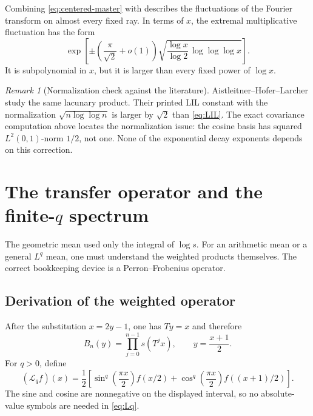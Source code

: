 \documentclass[11pt,oneside]{article}
\numberwithin{equation}{section}
\theoremstyle{definition}
\theoremstyle{remark}
\newtheorem{remark}[theorem]{Remark}
\newcommand{\Transfer}{\mathcal L}
\begin{document}
Combining \eqref{eq:centered-master} with  describes the fluctuations of
the Fourier transform on almost every fixed ray.  In terms of \(x\), the extremal
multiplicative fluctuation has the form
\begin{equation}
 \exp\!\left[\pm\left(\frac\pi{\sqrt2}+o(1)\right)
 \sqrt{\frac{\log x}{\log2}\,\log\log\log x}\right].
 \label{eq:multiplicative-LIL}
\end{equation}
It is subpolynomial in \(x\), but it is larger than every fixed power of \(\log x\).

\begin{remark}[Normalization check against the literature]
Aistleitner--Hofer--Larcher \cite{ahl} study the same lacunary product.  Their printed LIL
constant with the normalization \(\sqrt{n\log\log n}\) is larger by \(\sqrt2\) than
\eqref{eq:LIL}.  The exact covariance computation above locates the normalization issue:
the cosine basis has squared \(L^2(0,1)\)-norm \(1/2\), not one.  None of the exponential
decay exponents depends on this correction.
\end{remark}

\section{The transfer operator and the finite-\texorpdfstring{\(q\)}{q} spectrum}
\label{sec:transfer}

The geometric mean used only the integral of \(\log s\).  For an arithmetic mean or a
general \(L^q\) mean, one must understand the weighted products themselves.  The correct
bookkeeping device is a Perron--Frobenius operator.

\subsection{Derivation of the weighted operator}

After the substitution \(x=2y-1\), one has \(Ty=x\) and therefore
\begin{equation}
 B_n(y)=\prod_{j=0}^{n-1}s(T^jx),
 \qquad y=\frac{x+1}{2}.
 \label{eq:B-forward}
\end{equation}
For \(q>0\), define
\begin{equation}
 (\Transfer_qf)(x)
 =\frac12\left[
  \sin^q\!\left(\frac{\pi x}{2}\right)f(x/2)
 +\cos^q\!\left(\frac{\pi x}{2}\right)f((x+1)/2)
 \right].
 \label{eq:Lq}
\end{equation}
The sine and cosine are nonnegative on the displayed interval, so no absolute-value symbols
are needed in \eqref{eq:Lq}.
\end{document}

